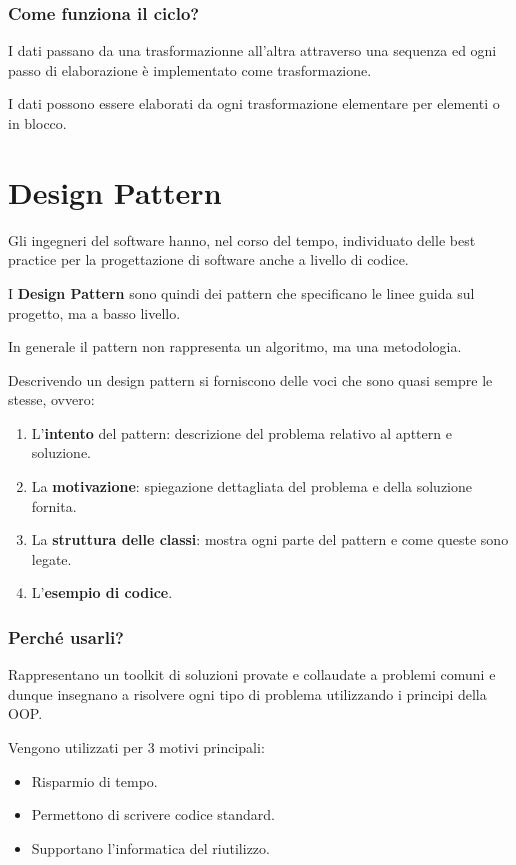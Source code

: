\documentclass{report}
\begin{document}
\subsubsection*{Come funziona il ciclo?}
I dati passano da una trasformazionne all'altra attraverso una sequenza ed ogni passo di elaborazione è implementato come trasformazione.

\noindent
I dati possono essere elaborati da ogni trasformazione elementare per elementi o in blocco.

\newpage
\section{Design Pattern}
Gli ingegneri del software hanno, nel corso del tempo, individuato delle best practice per la progettazione di software anche a livello di codice.

\noindent
I \textbf{Design Pattern} sono quindi dei pattern che specificano le linee guida sul progetto, ma a basso livello.

\noindent
In generale il pattern non rappresenta un algoritmo, ma una metodologia.

\noindent
Descrivendo un design pattern si forniscono delle voci che sono quasi sempre le stesse, ovvero:
\begin{enumerate}
    \item L'\textbf{intento} del pattern: descrizione del problema relativo al apttern e soluzione.
    \item La \textbf{motivazione}: spiegazione dettagliata del problema e della soluzione fornita.
    \item La \textbf{struttura delle classi}: mostra ogni parte del pattern e come queste sono legate.
    \item L'\textbf{esempio di codice}.
\end{enumerate}
    
\subsubsection*{Perché usarli?}
Rappresentano un toolkit di soluzioni provate e collaudate a problemi comuni e dunque insegnano a risolvere ogni tipo di problema utilizzando i principi della OOP.

\noindent
Vengono utilizzati per 3 motivi principali:
\begin{itemize}
    \item Risparmio di tempo.
    \item Permettono di scrivere codice standard.
    \item Supportano l'informatica del riutilizzo.
\end{itemize}
\end{document}

